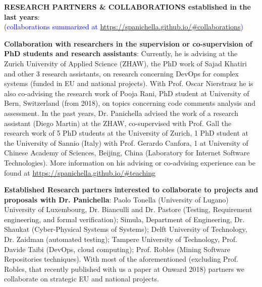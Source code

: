 \documentclass[12pt]{article}
\begin{document}
\textbf{RESEARCH PARTNERS \& COLLABORATIONS established in the last years}:\\
(\textcolor{blue}{collaborations summarized at \href{https://spanichella.github.io/\#collaborations}{https://spanichella.github.io/\#collaborations})}

\textbf{Collaboration with researchers in the supervision or co-supervision of PhD students and research assistants}:
 Currently, he is advising at the Zurich University of Applied Science (ZHAW), the PhD  work of Sajad Khatiri and other 3 research assistants, on research concerning DevOps for complex systems (funded in EU and national projects).
 With Prof. Oscar Nierstrasz he is also co-advising the research work of Pooja Rani, PhD student at University of Bern, Switzerland (from 2018), on topics concerning code comments analysis and assessment. In the past years, Dr. Panichella advised the work of a research assistant (Diego Martin) at the ZHAW, co-supervised with Prof. Gall the research work of 5 PhD students at the University of Zurich, 1 PhD student at the University of Sannio (Italy) with Prof. Gerardo Canfora, 1 at University of Chinese Academy of Sciences, Beijing, China (Laboratory for Internet Software Technologies).
 More information on his advising or co-advising experience can be found at \href{https://spanichella.github.io/\#teaching}{https://spanichella.github.io/\#teaching}

\textbf{Established Research partners interested to collaborate to projects and proposals with Dr. Panichella}: Paolo Tonella (University of Lugano)
 University of Luxembourg, Dr. Bianculli and Dr. Pastore (Testing, Requirement engineering, and formal verification); Simula, Department of Engineering, Dr. Shaukat (Cyber-Physical Systems of Systems);  Delft University of Technology,
Dr. Zaidman (automated testing); Tampere University of Technology, Prof. Davide Taibi (DevOps, cloud computing); Prof.
Robles (Mining Software Repositories techniques). With most of the aforementioned (excluding Prof. Robles, that recently published
with us a paper at Onward 2018) partners we collaborate on strategic EU and national projects. 
\end{document}
